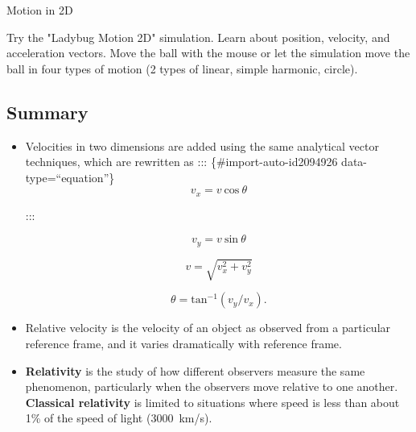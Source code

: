 \documentclass[
]{book}
\newenvironment{note}{}{}
\begin{document}
\hypertarget{eip-584}{}
\begin{note}

Motion in 2D

Try the "Ladybug Motion 2D" simulation. Learn about position,
velocity, and acceleration vectors. Move the ball with the mouse or let
the simulation move the ball in four types of motion (2 types of linear,
simple harmonic, circle).

\hypertarget{fs-id1167062339457}{}

\end{note}

\hypertarget{fs-id2070835-summary}{}
\hypertarget{summary-4}{%
\subsection{Summary}\label{summary-4}}

\begin{itemize}
\item
  \protect\hypertarget{import-auto-id2094922}{}{Velocities in two dimensions are added using the same analytical
  vector techniques, which are rewritten as}
  ::: \{\#import-auto-id2094926 data-type=``equation''\}
  \[{{v_{x} = v\ }\text{cos}\ \theta}{}\]

  :::

  \leavevmode\hypertarget{import-auto-id2094928}{}%
  \[{{v_{y} = v\ }\text{sin}\ \theta}{}\]

  \leavevmode\hypertarget{import-auto-id1887202}{}%
  \[{v = \sqrt{v_{x}^{2} + v_{y}^{2}}}{}\]

  \leavevmode\hypertarget{import-auto-id1938198}{}%
  \[{{\theta = \text{tan}^{- 1}}({v_{y}/v_{x}})}{}.\]
\item
  \protect\hypertarget{import-auto-id1847577}{}{Relative velocity is the velocity of an object as observed from a
  particular reference frame, and it varies dramatically with
  reference frame.}
\item
  \protect\hypertarget{import-auto-id1847580}{}{\textbf{Relativity} is the study of how different observers measure the
  same phenomenon, particularly when the observers move relative to
  one another. \textbf{Classical relativity} is limited to situations where
  speed is less than about 1\% of the speed of light
  (3000~km/s).}
\end{itemize}
\end{document}
